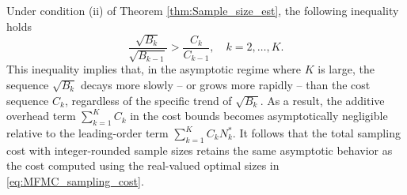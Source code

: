 %
Under condition (ii) of Theorem \ref{thm:Sample_size_est}, the following inequality holds
%
\begin{equation}
\label{eq:Bk_Ck_decay_rate}
    \frac{\sqrt{B_{k}}}{\sqrt{B_{k-1}}}>\frac{C_{k}}{C_{k-1}}, \quad k=2,\ldots,K.
\end{equation}
%
This inequality implies that, in the asymptotic regime where $K$ is large,  the sequence $\sqrt{B_k}$ decays more slowly -- or grows more rapidly -- than the cost sequence $C_k$, regardless of the specific trend of $\sqrt{B_k}$. As a result, the additive overhead term
$\sum_{k=1}^K C_k$ in the cost bounds becomes asymptotically negligible relative to the leading-order term $\sum_{k=1}^K C_kN_k^*$. It follows that the total sampling cost with integer-rounded sample sizes retains the same asymptotic behavior as the cost computed using the real-valued optimal sizes in \eqref{eq:MFMC_sampling_cost}.



